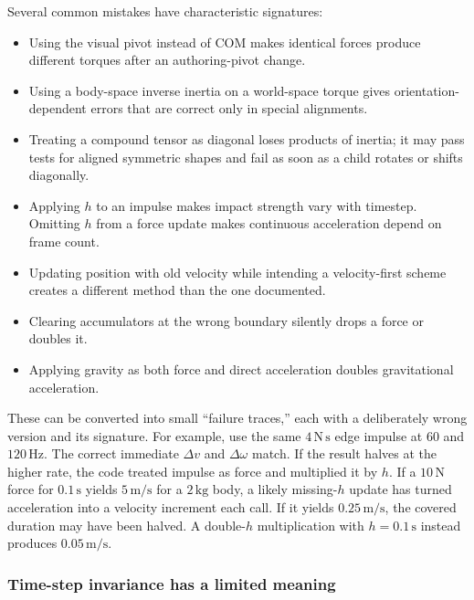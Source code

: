 Several common mistakes have characteristic signatures:

\begin{itemize}
\tightlist
\item
  Using the visual pivot instead of COM makes identical forces produce different torques after an authoring-pivot change.
\item
  Using a body-space inverse inertia on a world-space torque gives orientation-dependent errors that are correct only in special alignments.
\item
  Treating a compound tensor as diagonal loses products of inertia; it may pass tests for aligned symmetric shapes and fail as soon as a child rotates or shifts diagonally.
\item
  Applying \(h\) to an impulse makes impact strength vary with timestep. Omitting \(h\) from a force update makes continuous acceleration depend on frame count.
\item
  Updating position with old velocity while intending a velocity-first scheme creates a different method than the one documented.
\item
  Clearing accumulators at the wrong boundary silently drops a force or doubles it.
\item
  Applying gravity as both force and direct acceleration doubles gravitational acceleration.
\end{itemize}

These can be converted into small ``failure traces,'' each with a deliberately wrong version and its signature. For example, use the same \(4\,\mathrm{N\,s}\) edge impulse at \(60\) and \(120\,\mathrm{Hz}\). The correct immediate \(\Delta v\) and \(\Delta\omega\) match. If the result halves at the higher rate, the code treated impulse as force and multiplied it by \(h\). If a \(10\,\mathrm N\) force for \(0.1\,\mathrm s\) yields \(5\,\mathrm{m/s}\) for a \(2\,\mathrm{kg}\) body, a likely missing-\(h\) update has turned acceleration into a velocity increment each call. If it yields \(0.25\,\mathrm{m/s}\), the covered duration may have been halved. A double-\(h\) multiplication with \(h=0.1\,\mathrm s\) instead produces \(0.05\,\mathrm{m/s}\).

\subsubsection{Time-step invariance has a limited meaning}\label{06-engine-ii-ch034-time-step-invariance-has-a-limited-meaning}

